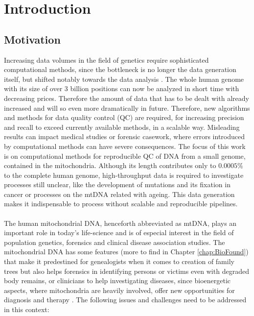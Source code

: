 \chapter{Introduction}
\label{chapterIntro}
\section{Motivation}
Increasing data volumes in the field of genetics require sophisticated computational methods, since the bottleneck is no longer the data generation itself, but shifted notably towards the data analysis \cite{Forer2016}. The whole human genome with its size of over 3 billion positions can now be analyzed in short time with decreasing prices. Therefore the amount of data that has to be dealt with already increased and will so even more dramatically in future. Therefore, new algorithms and methods for data quality control (QC) are required, for increasing precision and recall to exceed currently available methods, in a scalable way. Misleading results can impact medical studies or forensic casework, where errors introduced by computational methods can have severe consequences. The focus of this work is on computational methods for reproducible QC of DNA from a small genome, contained in the mitochondria. Although its length contributes only to $0.0005\%$ to the complete human genome, high-throughput data is required to investigate processes still unclear, like the development of mutations and its fixation in cancer or processes on the mtDNA related with ageing. This data generation makes it indispensable to process without scalable and reproducible pipelines. 
\\
\\
The human mitochondrial DNA, henceforth abbreviated as mtDNA, plays an important role in today's life-science and is of especial interest in the field of population genetics, forensics and clinical disease association studies. The mitochondrial DNA has some features (more to find in Chapter \ref{chap:BioFound}) that make it predestined for genealogists when it comes to creation of family trees but also helps forensics in identifying persons or victims even with degraded body remains, or clinicians to help investigating diseases, since bioenergetic aspects, where mitochondria are heavily involved, offer new opportunities for diagnosis and therapy \cite{Picard2016}.
The following issues and challenges need to be addressed in this context:
